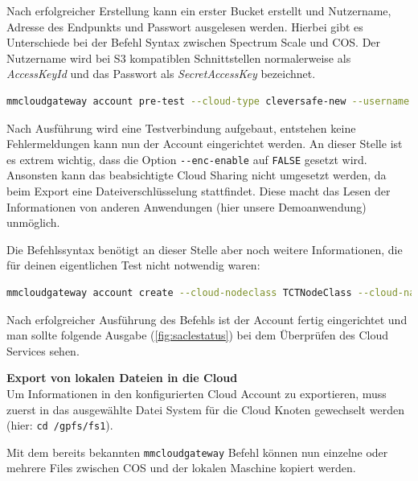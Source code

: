 Nach erfolgreicher Erstellung kann ein erster Bucket erstellt und Nutzername, Adresse des Endpunkts und Passwort ausgelesen werden. Hierbei gibt es Unterschiede bei der Befehl Syntax zwischen Spectrum Scale und \ac{COS}. 
Der Nutzername wird bei S3 kompatiblen Schnittstellen normalerweise als \textit{AccessKeyId} und das Passwort als \textit{SecretAccessKey} bezeichnet.\\

\begin{lstlisting}[language=bash, caption=Vortest des Cloud Sharing Accounts]
mmcloudgateway account pre-test --cloud-type cleversafe-new --username "<username>" --pwd-file <path/file/your/secretAccessKey> --cloud-url <cos/endpoint>
\end{lstlisting}

Nach Ausführung wird eine Testverbindung aufgebaut, entstehen keine Fehlermeldungen kann nun der Account eingerichtet werden. An dieser Stelle ist es extrem wichtig, dass die Option \lstinline|--enc-enable| auf \lstinline|FALSE| gesetzt wird. Ansonsten kann das beabsichtigte Cloud Sharing nicht umgesetzt werden, da beim Export eine Dateiverschlüsselung stattfindet. Diese macht das Lesen der Informationen von anderen Anwendungen (hier unsere Demoanwendung) unmöglich.

Die Befehlssyntax benötigt an dieser Stelle aber noch weitere Informationen, die für deinen eigentlichen Test nicht notwendig waren:\\

\begin{lstlisting}[language=bash, caption=Einrichtung des Cloud Sharing Accounts]
mmcloudgateway account create --cloud-nodeclass TCTNodeClass --cloud-name mcstore --cloud-type cleversafe-new --username "<username>" --pwd-file <path/file/your/secretAccessKey> --enable TRUE --cloud-url <cos/endpoint> --enc-enable FALSE
\end{lstlisting}

Nach erfolgreicher Ausführung des Befehls ist der Account fertig eingerichtet und man sollte folgende Ausgabe (\autoref{fig:saclestatus}) bei dem Überprüfen des Cloud Services sehen.

\textbf{Export von lokalen Dateien in die Cloud}\\
Um Informationen in den konfigurierten Cloud Account zu exportieren, muss zuerst in das ausgewählte Datei System für die Cloud Knoten gewechselt werden (hier: \lstinline|cd /gpfs/fs1|).

Mit dem bereits bekannten \lstinline|mmcloudgateway| Befehl können nun einzelne oder mehrere Files zwischen \ac{COS} und der lokalen Maschine kopiert werden.

